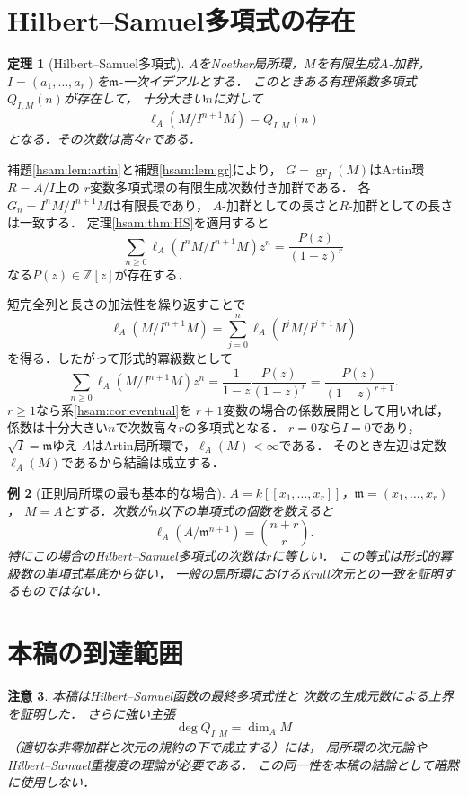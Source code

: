 \documentclass[a5paper,10pt,onecolumn]{jsarticle}
\makeatletter
\theoremstyle{mathnotetheorem}
\newtheorem{theorem}{定理}[section]
\newtheorem{example}[theorem]{例}
\newtheorem{remark}[theorem]{注意}
\renewcommand{\proofname}{証明}
\renewenvironment{proof}[1][\proofname]{%
  \par\pushQED{\qed}\normalfont\topsep4\p@\@plus2\p@\relax
  \trivlist\item[\hskip\labelsep\bfseries #1]\ignorespaces
}{\popQED\endtrivlist\@endpefalse}
\makeatother
\begin{document}
\section{Hilbert--Samuel多項式の存在}
\begin{theorem}[Hilbert--Samuel多項式]\label{hsam:thm:HSamuel}
$A$をNoether局所環，$M$を有限生成$A$-加群，
$I=(a_1,\ldots,a_r)$を$\mathfrak m$-一次イデアルとする．
このときある有理係数多項式$Q_{I,M}(n)$が存在して，
十分大きい$n$に対して
\[
 \ell_A(M/I^{n+1}M)=Q_{I,M}(n)
\]
となる．その次数は高々$r$である．
\end{theorem}
\begin{proof}
補題\ref{hsam:lem:artin}と補題\ref{hsam:lem:gr}により，
$G=\operatorname{gr}_I(M)$はArtin環$R=A/I$上の
$r$変数多項式環の有限生成次数付き加群である．
各$G_n=I^nM/I^{n+1}M$は有限長であり，
$A$-加群としての長さと$R$-加群としての長さは一致する．
定理\ref{hsam:thm:HS}を適用すると
\[
 \sum_{n\ge0}\ell_A(I^nM/I^{n+1}M)z^n
 =\frac{P(z)}{(1-z)^r}
\]
なる$P(z)\in\mathbb Z[z]$が存在する．

短完全列と長さの加法性を繰り返すことで
\[
 \ell_A(M/I^{n+1}M)
  =\sum_{j=0}^n\ell_A(I^jM/I^{j+1}M)
\]
を得る．したがって形式的冪級数として
\[
 \sum_{n\ge0}\ell_A(M/I^{n+1}M)z^n
 =\frac{1}{1-z}\frac{P(z)}{(1-z)^r}
 =\frac{P(z)}{(1-z)^{r+1}}.
\]
$r\ge1$なら系\ref{hsam:cor:eventual}を
$r+1$変数の場合の係数展開として用いれば，
係数は十分大きい$n$で次数高々$r$の多項式となる．
$r=0$なら$I=0$であり，$\sqrt I=\mathfrak m$ゆえ
$A$はArtin局所環で，$\ell_A(M)<\infty$である．
そのとき左辺は定数$\ell_A(M)$であるから結論は成立する．
\end{proof}

\begin{example}[正則局所環の最も基本的な場合]
$A=k[[x_1,\ldots,x_r]]$，$\mathfrak m=(x_1,\ldots,x_r)$，
$M=A$とする．次数が$n$以下の単項式の個数を数えると
\[
 \ell_A(A/\mathfrak m^{n+1})
   =\binom{n+r}{r}.
\]
特にこの場合のHilbert--Samuel多項式の次数は$r$に等しい．
この等式は形式的冪級数の単項式基底から従い，
一般の局所環におけるKrull次元との一致を証明するものではない．
\end{example}

\section{本稿の到達範囲}
\begin{remark}
本稿はHilbert--Samuel函数の最終多項式性と
次数の生成元数による上界を証明した．
さらに強い主張
\[
 \deg Q_{I,M}=\dim_A M
\]
（適切な非零加群と次元の規約の下で成立する）には，
局所環の次元論やHilbert--Samuel重複度の理論が必要である．
この同一性を本稿の結論として暗黙に使用しない．
\end{remark}
\end{document}
